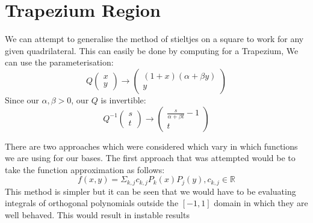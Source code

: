 \documentclass{article}
\begin{document}
\section{Trapezium Region}
We can attempt to generalise the method of stieltjes on a square to work for any given quadrilateral.
This can easily be done by computing for a Trapezium,
We can use the parameterisation: $$Q\begin{pmatrix}x\\y\end{pmatrix}\rightarrow
\begin{pmatrix}(1+x)(\alpha+\beta y)\\y\end{pmatrix}$$
Since our $\alpha, \beta > 0$, our $Q$ is invertible:
$$Q^{-1}\begin{pmatrix}s\\t\end{pmatrix}\rightarrow\begin{pmatrix}\frac{s}{\alpha+\beta t}-1\\t\end{pmatrix}$$

There are two approaches which were considered which vary in which functions we are using for our bases.
The first approach that was attempted would be to take the function approximation as follows:
$$f(x,y)=\Sigma_{k,j}c_{k,j}P_k(x)P_j(y), c_{k,j}\in \mathbb{R}$$
This method is simpler but it can be seen that we would have to be evaluating integrals of orthogonal polynomials outside the
$[-1,1]$ domain in which they are well behaved.
This would result in instable results
\end{document}
